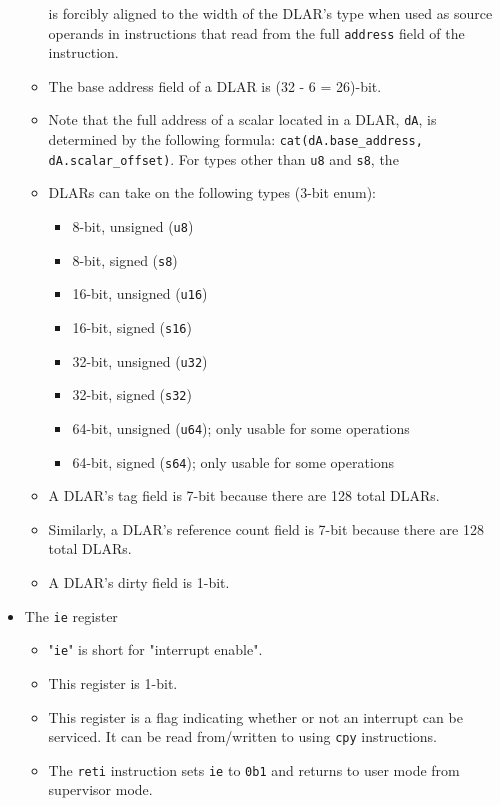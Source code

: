 \documentclass{article}
\begin{document}
\begin{itemize}
\begin{itemize}
			is forcibly aligned to the width of the DLAR's type when used
			as source operands in instructions that read from the full
			\texttt{address} field of the instruction.
		\item The base address field of a DLAR is (32 - 6 = 26)-bit.
		\item Note that the full address of a scalar located in a DLAR,
			\texttt{dA}, is determined by the following formula:
			\texttt{cat(dA.base\_address, dA.scalar\_offset)}. For types
			other than \texttt{u8} and \texttt{s8}, the  
		\item DLARs can take on the following types (3-bit enum):
			\begin{itemize}
			\item 8-bit, unsigned (\texttt{u8})
			\item 8-bit, signed (\texttt{s8})
			\item 16-bit, unsigned (\texttt{u16})
			\item 16-bit, signed (\texttt{s16})
			\item 32-bit, unsigned (\texttt{u32})
			\item 32-bit, signed (\texttt{s32})
			\item 64-bit, unsigned (\texttt{u64});
				only usable for some operations
			\item 64-bit, signed (\texttt{s64});
				only usable for some operations
			\end{itemize}
		\item A DLAR's tag field is 7-bit because there are 128 total
			DLARs.
		\item Similarly, a DLAR's reference count field is 7-bit because
			there are 128 total DLARs.
		\item A DLAR's dirty field is 1-bit.
		\end{itemize}
	\item The \texttt{ie} register
		\begin{itemize}
		\item "\texttt{ie}" is short for "interrupt enable".
		\item This register is 1-bit.
		\item This register is a flag indicating whether or not an
			interrupt can be serviced. It can be read from/written to using
			\texttt{cpy} instructions.
		\item The \texttt{reti} instruction sets \texttt{ie} to
			\texttt{0b1} and returns to user mode from supervisor mode.
		\end{itemize}

\end{itemize}
\end{document}
